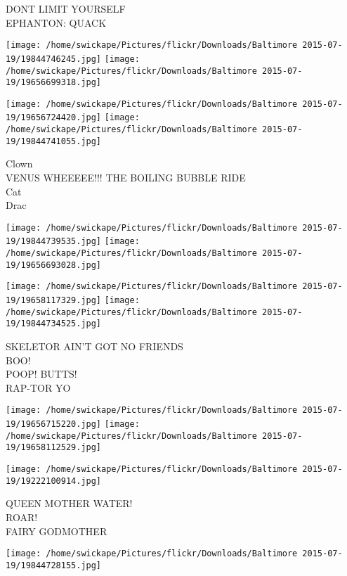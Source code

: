 \documentclass[10pt,letterpaper]{article}
\begin{document}
DONT LIMIT YOURSELF\\
EPHANTON: QUACK\\
\pagebreak

\texttt{[image: /home/swickape/Pictures/flickr/Downloads/Baltimore 2015-07-19/19844746245.jpg]}
\texttt{[image: /home/swickape/Pictures/flickr/Downloads/Baltimore 2015-07-19/19656699318.jpg]}

\texttt{[image: /home/swickape/Pictures/flickr/Downloads/Baltimore 2015-07-19/19656724420.jpg]}
\texttt{[image: /home/swickape/Pictures/flickr/Downloads/Baltimore 2015-07-19/19844741055.jpg]}

Clown\\
VENUS WHEEEEE!!! THE BOILING BUBBLE RIDE\\
Cat\\
Drac\\
\pagebreak

\texttt{[image: /home/swickape/Pictures/flickr/Downloads/Baltimore 2015-07-19/19844739535.jpg]}
\texttt{[image: /home/swickape/Pictures/flickr/Downloads/Baltimore 2015-07-19/19656693028.jpg]}

\texttt{[image: /home/swickape/Pictures/flickr/Downloads/Baltimore 2015-07-19/19658117329.jpg]}
\texttt{[image: /home/swickape/Pictures/flickr/Downloads/Baltimore 2015-07-19/19844734525.jpg]}

SKELETOR AIN'T GOT NO FRIENDS\\
BOO!\\
POOP!  BUTTS!\\
RAP{-}TOR YO\\
\pagebreak

\texttt{[image: /home/swickape/Pictures/flickr/Downloads/Baltimore 2015-07-19/19656715220.jpg]}
\texttt{[image: /home/swickape/Pictures/flickr/Downloads/Baltimore 2015-07-19/19658112529.jpg]}

\vspace{0.25in}
\texttt{[image: /home/swickape/Pictures/flickr/Downloads/Baltimore 2015-07-19/19222100914.jpg]}

QUEEN MOTHER WATER!\\
ROAR!\\
FAIRY GODMOTHER\\
\pagebreak

\texttt{[image: /home/swickape/Pictures/flickr/Downloads/Baltimore 2015-07-19/19844728155.jpg]}
\end{document}
